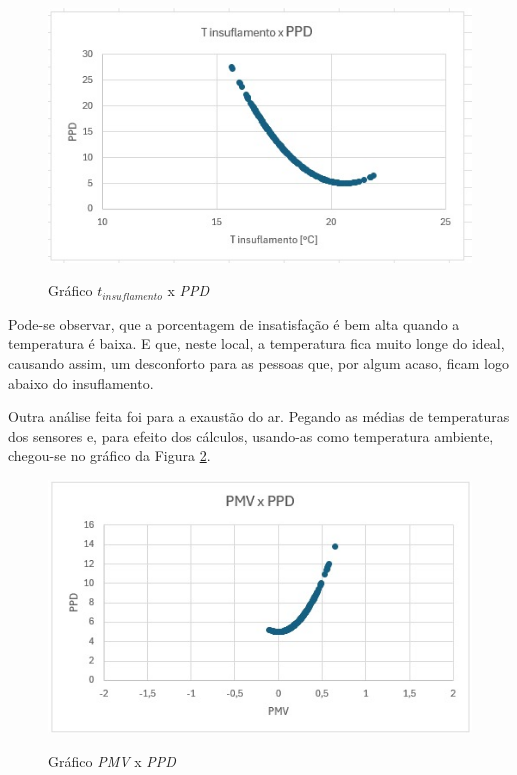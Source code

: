 \documentclass[acronym,symbols,table]{fei}
\begin{document}
\begin{figure}[!htb]
    \centering
    \caption{Gráfico $t_{insuflamento}$ x \textit{PPD}}
    \includegraphics[width=0.8\linewidth]{Imagens/tinsu-pmv.jpeg}
    \label{fig:tinsu-pmv}
\end{figure}



 Pode-se observar, que a porcentagem de insatisfação é bem alta quando a temperatura é baixa. E que, neste local, a temperatura fica muito longe do ideal, causando assim, um desconforto para as pessoas que, por algum acaso, ficam logo abaixo do insuflamento. 
 
 Outra análise feita foi para a exaustão do ar. Pegando as médias de temperaturas dos sensores e, para efeito dos cálculos, usando-as como temperatura ambiente, chegou-se no gráfico da Figura \ref{fig:pmv-ppd-exaustao}.

\begin{figure}[!htb]
    \centering
    \caption{Gráfico \textit{PMV} x \textit{PPD}}
    \includegraphics[width=0.8\linewidth]{Imagens/pmv-ppd-exaustao.jpeg}
    \label{fig:pmv-ppd-exaustao}
\end{figure}
\end{document}
